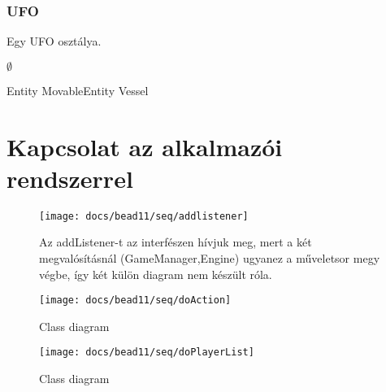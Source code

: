 \documentclass[../../projlab]{subfiles}
\begin{document}
\subsubsection{UFO}
\begin{class-template-responsibility}
    Egy UFO osztálya. 
\end{class-template-responsibility}
\begin{class-template-interface}
    $\emptyset$
\end{class-template-interface}
\begin{class-template-baseclass}
    Entity \baseclass MovableEntity \baseclass Vessel
\end{class-template-baseclass}
\begin{class-template-attribute}
\end{class-template-attribute}
\begin{class-template-method}
\end{class-template-method}

\section{Kapcsolat az alkalmazói rendszerrel}
\begin{figure}[H] 
    \centering 
    \texttt{[image: docs/bead11/seq/addlistener]} 
    \caption{Az addListener-t az interfészen hívjuk meg, mert a két megvalósításnál (GameManager,Engine) ugyanez a műveletsor megy végbe, így két külön diagram nem készült róla.} 
\end{figure} 

\begin{figure}[H] 
    \centering 
    \texttt{[image: docs/bead11/seq/doAction]} 
    \caption{Class diagram} 
\end{figure}

\begin{figure}[H] 
    \centering 
    \texttt{[image: docs/bead11/seq/doPlayerList]} 
    \caption{Class diagram} 
\end{figure} 
\end{document}
